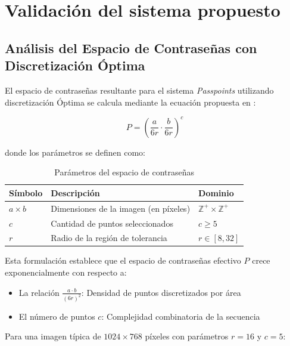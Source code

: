 \chapter{Validaci\'on del sistema propuesto}\label{chapter:validation}


\section{Análisis del Espacio de Contraseñas con Discretización Óptima}
\label{subsec:espacio-contrasenas}

El espacio de contraseñas resultante para el sistema \textit{Passpoints} utilizando discretización Óptima se calcula mediante la ecuación propuesta en \cite{birget2006graphical}:

\begin{equation}
	P = \left( \frac{a}{6r} \cdot \frac{b}{6r} \right)^c
	\label{eq:espacio-contrasenas}
\end{equation}

donde los parámetros se definen como:

\begin{table}[ht]
	\centering
	\caption{Parámetros del espacio de contraseñas}
	\label{tab:parametros-espacio}
	\begin{tabularx}{0.9\textwidth}{lXl}
		\toprule
		\textbf{Símbolo} & \textbf{Descripción} & \textbf{Dominio} \\
		\midrule
		$a \times b$ & Dimensiones de la imagen (en píxeles) & $\mathbb{Z}^+ \times \mathbb{Z}^+$ \\
		$c$ & Cantidad de puntos seleccionados & $c \geq 5$ \\
		$r$ & Radio de la región de tolerancia & $r \in [8, 32]$ \\
		\bottomrule
	\end{tabularx}
\end{table}

\vspace{0.5cm}

Esta formulación establece que el espacio de contraseñas efectivo $P$ crece exponencialmente con respecto a:
\begin{itemize}
	\item La relación $\frac{a \cdot b}{(6r)^2}$: Densidad de puntos discretizados por área
	\item El número de puntos $c$: Complejidad combinatoria de la secuencia
\end{itemize}

Para una imagen típica de $1024 \times 768$ píxeles con parámetros $r = 16$ y $c = 5$:

